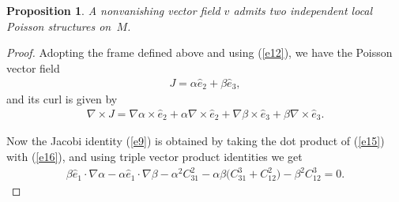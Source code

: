 \documentclass[pdftex]{sigma}
\numberwithin{equation}{section}
\newtheorem{Proposition}[Theorem]{Proposition}
 { \theoremstyle{definition}
\newtheorem{Definition}[Theorem]{Definition} }
\begin{document}
\begin{Proposition}\label{proposition1}
A nonvanishing vector field $v$ admits two independent local Poisson structures on~$M$.
\end{Proposition}

\begin{proof}
Adopting the frame def\/ined above and using (\ref{e12}), we have the Poisson vector f\/ield
\begin{gather}
J=\alpha \widehat{e}_{2}+\beta \widehat{e}_{3}, \label{e15}
\end{gather}
and its curl is given by
\begin{gather}
\nabla \times J=\nabla \alpha \times \widehat{e}_{2}+\alpha \nabla \times \widehat{e}_{2}+\nabla \beta \times \widehat{e}_{3}+\beta \nabla \times \widehat{e}_{3}. \label{e16}
\end{gather}

Now the Jacobi identity (\ref{e9}) is obtained by taking the dot product of (\ref{e15}) with (\ref{e16}), and using triple vector product identities we get
\begin{gather}
\beta \widehat{e}_{1}\cdot \nabla \alpha -\alpha \widehat{e}_{1}\cdot \nabla\beta -\alpha ^{2}C_{31}^{2}-\alpha \beta \big(C_{31}^{3}+C_{12}^{2}\big) -\beta ^{2}C_{12}^{3}=0. \label{e17}
\end{gather}


\end{proof}
\end{document}

